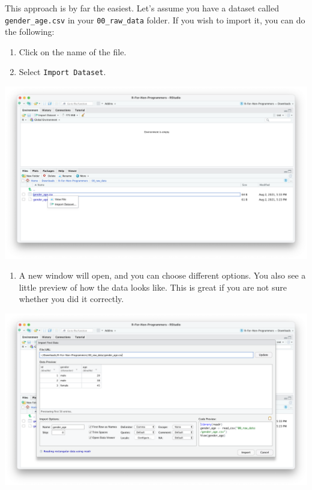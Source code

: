 \documentclass[
  letterpaper,
  DIV=11,
  numbers=noendperiod]{scrreprt}
\providecommand{\tightlist}{%
  \setlength{\itemsep}{0pt}\setlength{\parskip}{0pt}}\usepackage{longtable,booktabs,array}
\begin{document}
This approach is by far the easiest. Let's assume you have a dataset
called \texttt{gender\_age.csv} in your \texttt{00\_raw\_data} folder.
If you wish to import it, you can do the following:

\begin{enumerate}
\def\labelenumi{\arabic{enumi}.}
\item
  Click on the name of the file.
\item
  Select \texttt{Import\ Dataset}.
\end{enumerate}

\includegraphics{images/chapter_07_img/01_files_pane_import/01_files_pane_import.png}

\begin{enumerate}
\def\labelenumi{\arabic{enumi}.}
\setcounter{enumi}{2}
\tightlist
\item
  A new window will open, and you can choose different options. You also
  see a little preview of how the data looks like. This is great if you
  are not sure whether you did it correctly.
\end{enumerate}

\includegraphics{images/chapter_07_img/01_files_pane_import/02_files_pane_import.png}
\end{document}
